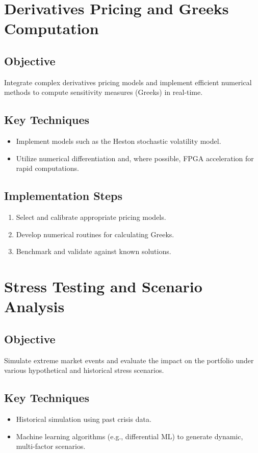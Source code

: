 \documentclass[11pt]{article}
\begin{document}
\section{Derivatives Pricing and Greeks Computation}
\subsection{Objective}
Integrate complex derivatives pricing models and implement efficient numerical methods to compute sensitivity measures (Greeks) in real-time.

\subsection{Key Techniques}
\begin{itemize}
    \item Implement models such as the Heston stochastic volatility model.
    \item Utilize numerical differentiation and, where possible, FPGA acceleration for rapid computations.
\end{itemize}

\subsection{Implementation Steps}
\begin{enumerate}
    \item Select and calibrate appropriate pricing models.
    \item Develop numerical routines for calculating Greeks.
    \item Benchmark and validate against known solutions.
\end{enumerate}

\section{Stress Testing and Scenario Analysis}
\subsection{Objective}
Simulate extreme market events and evaluate the impact on the portfolio under various hypothetical and historical stress scenarios.

\subsection{Key Techniques}
\begin{itemize}
    \item Historical simulation using past crisis data.
    \item Machine learning algorithms (e.g., differential ML) to generate dynamic, multi-factor scenarios.
\end{itemize}
\end{document}
